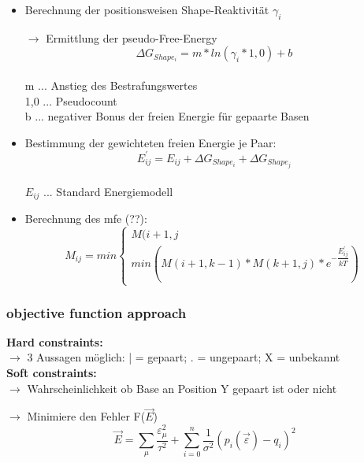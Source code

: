 \begin{itemize}
\item Berechnung der positionsweisen Shape-Reaktivität $\gamma_i$

\item[$\rightarrow$] Ermittlung der pseudo-Free-Energy \\
\begin{equation}
\Delta G_{Shape_i} = m * ln(\gamma_i * 1,0) + b
\end{equation} \\

m ... Anstieg des Bestrafungswertes \\
1,0 ... Pseudocount \\
b ... negativer Bonus der freien Energie für gepaarte Basen \\

\item Bestimmung der gewichteten freien Energie je Paar: \\
\begin{equation}
E^{'}_{ij} = E_{ij} + \Delta G_{Shape_i} + \Delta G_{Shape_j}
\end{equation} \\
$E_{ij}$ ... Standard Energiemodell

\item Berechnung des mfe (??): \\
\begin{equation}
M_{ij} = min
\begin{cases} 
M(i+1,j \\
min (M(i+1,k-1)*M(k+1,j)*e^{-\dfrac{E^{'}_{ij}}{kT}})
\end{cases}
\end{equation}
\end{itemize}

\subsubsection{objective function approach}
\textbf{Hard constraints:} \\
$\rightarrow$ 3 Aussagen möglich: | = gepaart; . = ungepaart; X = unbekannt \\
\textbf{Soft constraints:} \\ 
$\rightarrow$ Wahrscheinlichkeit ob Base an Position Y gepaart ist oder nicht 

$\rightarrow$ Minimiere den Fehler F($\vec{E}$) \\
\begin{equation}
\vec{E} = \sum_{\mu} \dfrac{\varepsilon_{\mu}^{2}}{\tau^2} + \sum_{i = 0}^{n} \dfrac{1}{\sigma^2}(p_i(\vec{\varepsilon}) -q_i)^2
\end{equation} 

